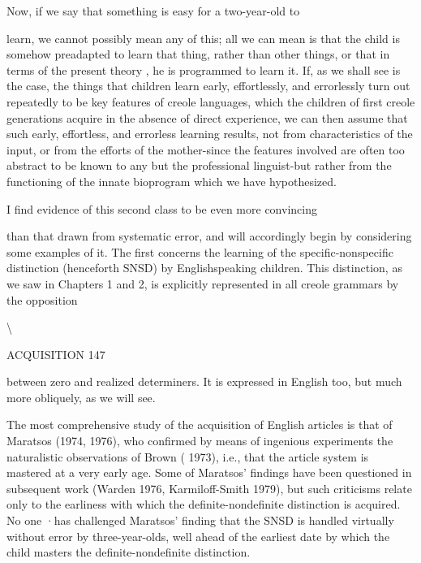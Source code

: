 Now, if we say that something is easy for a two-year-old to

learn, we cannot possibly mean any of this; all we can mean is that the child is somehow preadapted to learn that thing, rather than other things, or that in terms of the present theory , he is programmed to learn it. If, as we shall see is the case, the things that children learn early, effortlessly, and errorlessly turn out repeatedly to be key features of creole languages, which the children of first creole generations acquire in the absence of direct experience, we can then assume that such early, effortless, and errorless learning results, not from charac\-teristics of the input, or from the efforts of the mother-since the features involved are often too abstract to be known to any but the professional linguist-but rather from the functioning of the innate bioprogram which we have hypothesized.

I find evidence of this second class to be even more convincing

than that drawn from systematic error, and will accordingly begin by considering some examples of it. The first concerns the learning of the specific-nonspecific distinction (henceforth SNSD) by English\-speaking children. This distinction, as we saw in Chapters 1 and 2, is explicitly represented in all creole grammars by the opposition

{\textbackslash}

ACQUISITION 147

between zero and realized determiners. It is expressed in English too, but much more obliquely, as we will see.

The most comprehensive study of the acquisition of English articles is that of Maratsos (1974, 1976), who confirmed by means of ingenious experiments the naturalistic observations of Brown ( 1973), i.e., that the article system is mastered at a very early age. Some of Maratsos' findings have been questioned in subsequent work (Warden 1976, Karmiloff-Smith 1979), but such criticisms relate only to the earliness with which the definite-nondefinite distinction is acquired. No one ·has challenged Maratsos' finding that the SNSD is handled virtually without error by three-year-olds, well ahead of the earliest date by which the child masters the definite-nondefinite distinction.

